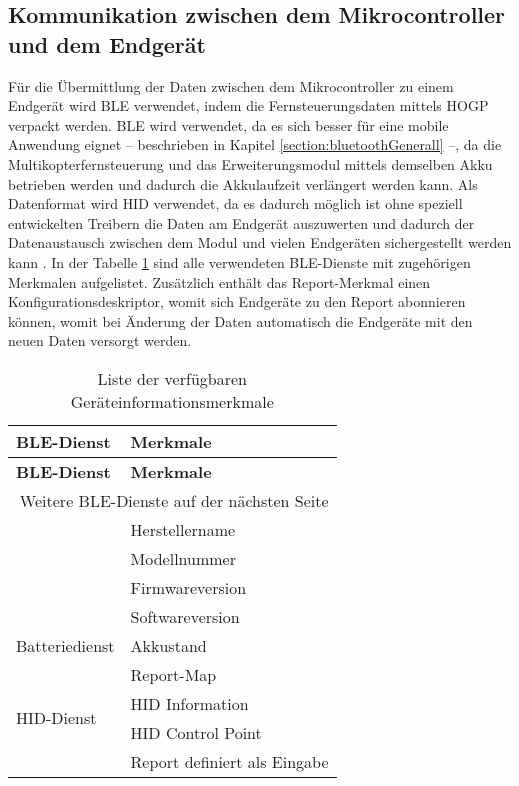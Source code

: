 \subsection{Kommunikation zwischen dem Mikrocontroller und dem Endgerät}
\label{section:communicationModuleDevice}
Für die Übermittlung der Daten zwischen dem Mikrocontroller zu einem Endgerät wird \ac{BLE} verwendet, indem die Fernsteuerungsdaten mittels \ac{HOGP} verpackt werden. \ac{BLE} wird verwendet, da es sich besser für eine mobile Anwendung eignet -- beschrieben in Kapitel \ref{section:bluetoothGenerall} --, da die Multikopterfernsteuerung und das Erweiterungsmodul mittels demselben Akku betrieben werden und dadurch die Akkulaufzeit verlängert werden kann. Als Datenformat wird \ac{HID} verwendet, da es dadurch möglich ist ohne speziell entwickelten Treibern die Daten am Endgerät auszuwerten und dadurch der Datenaustausch zwischen dem Modul und vielen Endgeräten sichergestellt werden kann \cite{microsoftHID}. In der Tabelle \ref{table:usedServicesAndCharacteristics} sind alle verwendeten \ac{BLE}-Dienste mit zugehörigen Merkmalen aufgelistet. Zusätzlich enthält das Report-Merkmal einen Konfigurationsdeskriptor, womit sich Endgeräte zu den Report abonnieren können, womit bei Änderung der Daten automatisch die Endgeräte mit den neuen Daten versorgt werden. 

\begin{longtable}[c]{|l|l|}
    \caption{Liste der verfügbaren Geräteinformationsmerkmale}
    \label{table:usedServicesAndCharacteristics}\\
    \hline
    \textbf{\ac{BLE}-Dienst} & \textbf{Merkmale}\\
    \hline
    \hline
    \endfirsthead

    \hline
    \textbf{\ac{BLE}-Dienst} & \textbf{Merkmale}\\
    \hline
    \hline
    \endhead

    \hline
    \multicolumn{2}{|r|}{Weitere \ac{BLE}-Dienste auf der nächsten Seite}\\
    \hline
    \endfoot

    \hline
    \endlastfoot
    
    \multirow{4}{*}{Geräteinformationsdienst} & Herstellername\\
    \cline{2-2}
     & Modellnummer\\
     \cline{2-2}
     & Firmwareversion\\
     \cline{2-2}
     & Softwareversion\\
    \hline
    \multirow{1}{*}{Batteriedienst} & Akkustand\\
    \hline
    \multirow{4}{*}{\ac{HID}-Dienst} & Report-Map\\
    \cline{2-2}
     & \ac{HID} Information\\
     \cline{2-2}
     & \ac{HID} Control Point\\
     \cline{2-2}
     & Report definiert als Eingabe\\
\end{longtable}

